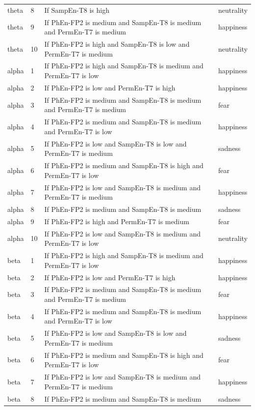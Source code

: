 \begin{longtable}{llp{7.2cm}l}
theta & 8 & If SampEn-T8 is high & neutrality \\
theta & 9 & If PhEn-FP2 is medium and SampEn-T8 is medium and PermEn-T7 is medium & happiness \\
theta & 10 & If PhEn-FP2 is high and SampEn-T8 is low and PermEn-T7 is medium & neutrality \\
alpha & 1 & If PhEn-FP2 is high and SampEn-T8 is medium and PermEn-T7 is low & happiness \\
alpha & 2 & If PhEn-FP2 is low and PermEn-T7 is high & happiness \\
alpha & 3 & If PhEn-FP2 is medium and SampEn-T8 is medium and PermEn-T7 is medium & fear \\
alpha & 4 & If PhEn-FP2 is medium and SampEn-T8 is medium and PermEn-T7 is low & happiness \\
alpha & 5 & If PhEn-FP2 is low and SampEn-T8 is low and PermEn-T7 is medium & sadness \\
alpha & 6 & If PhEn-FP2 is medium and SampEn-T8 is high and PermEn-T7 is low & fear \\
alpha & 7 & If PhEn-FP2 is low and SampEn-T8 is medium and PermEn-T7 is medium & happiness \\
alpha & 8 & If PhEn-FP2 is medium and SampEn-T8 is medium & sadness \\
alpha & 9 & If PhEn-FP2 is high and PermEn-T7 is medium & fear \\
alpha & 10 & If PhEn-FP2 is low and SampEn-T8 is medium and PermEn-T7 is low & neutrality \\
beta & 1 & If PhEn-FP2 is high and SampEn-T8 is medium and PermEn-T7 is low & happiness \\
beta & 2 & If PhEn-FP2 is low and PermEn-T7 is high & happiness \\
beta & 3 & If PhEn-FP2 is medium and SampEn-T8 is medium and PermEn-T7 is medium & fear \\
beta & 4 & If PhEn-FP2 is medium and SampEn-T8 is medium and PermEn-T7 is low & happiness \\
beta & 5 & If PhEn-FP2 is low and SampEn-T8 is low and PermEn-T7 is medium & sadness \\
beta & 6 & If PhEn-FP2 is medium and SampEn-T8 is high and PermEn-T7 is low & fear \\
beta & 7 & If PhEn-FP2 is low and SampEn-T8 is medium and PermEn-T7 is medium & happiness \\
beta & 8 & If PhEn-FP2 is medium and SampEn-T8 is medium & sadness \\

\end{longtable}
